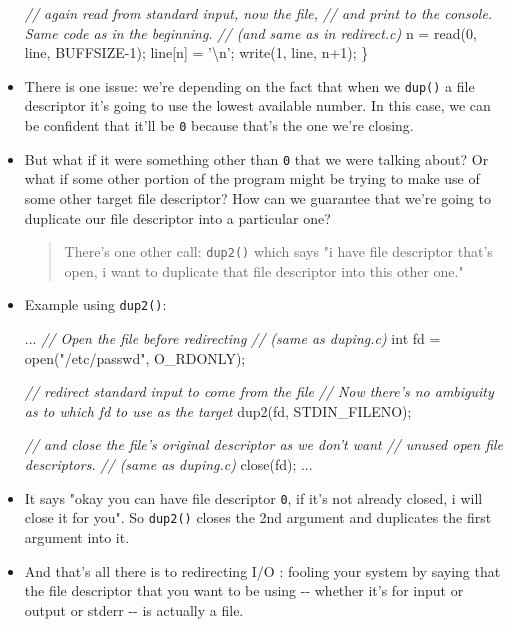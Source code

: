 \documentclass[]{article}
\newenvironment{Shaded}{}{}
\newcommand{\DataTypeTok}[1]{\textcolor[rgb]{0.56,0.13,0.00}{#1}}
\newcommand{\DecValTok}[1]{\textcolor[rgb]{0.25,0.63,0.44}{#1}}
\newcommand{\CharTok}[1]{\textcolor[rgb]{0.25,0.44,0.63}{#1}}
\newcommand{\StringTok}[1]{\textcolor[rgb]{0.25,0.44,0.63}{#1}}
\newcommand{\CommentTok}[1]{\textcolor[rgb]{0.38,0.63,0.69}{\textit{#1}}}
\newcommand{\NormalTok}[1]{#1}
\begin{document}
\begin{itemize}
\begin{Shaded}
\begin{Highlighting}[]
    \CommentTok{// again read from standard input, now the file, }
    \CommentTok{// and print to the console. Same code as in the beginning.}
    \CommentTok{// (and same as in redirect.c)}
\NormalTok{    n = read(}\DecValTok{0}\NormalTok{, line, BUFFSIZE}\DecValTok{-1}\NormalTok{);}
\NormalTok{    line[n] = }\CharTok{'\textbackslash{}n'}\NormalTok{;}
\NormalTok{    write(}\DecValTok{1}\NormalTok{, line, n+}\DecValTok{1}\NormalTok{);}
\NormalTok{\}}
\end{Highlighting}
\end{Shaded}
\item
  There is one issue: we're depending on the fact that when we
  \texttt{dup()} a file descriptor it's going to use the lowest
  available number. In this case, we can be confident that it'll be
  \texttt{0} because that's the one we're closing. 
\item
  But what if it were something other than \texttt{0} that we were
  talking about? Or what if some other portion of the program might be
  trying to make use of some other target file descriptor? How can we
  guarantee that we're going to duplicate our file descriptor into a
  particular one?

  \begin{quote}
  There's one other call: \texttt{dup2()} which says "i have file
  descriptor that's open, i want to duplicate that file descriptor into
  this other one."
  \end{quote}
\item
  Example using \texttt{dup2()}:

\begin{Shaded}
\begin{Highlighting}[]
\NormalTok{...}
\CommentTok{// Open the file before redirecting}
\CommentTok{// (same as duping.c)}
\DataTypeTok{int}\NormalTok{ fd = open(}\StringTok{"/etc/passwd"}\NormalTok{, O_RDONLY);}

\CommentTok{// redirect standard input to come from the file}
\CommentTok{// Now there's no ambiguity as to which fd to use as the target}
\NormalTok{dup2(fd, STDIN_FILENO);}

\CommentTok{// and close the file's original descriptor as we don't want}
\CommentTok{// unused open file descriptors. }
\CommentTok{// (same as duping.c)}
\NormalTok{close(fd);}
\NormalTok{...}
\end{Highlighting}
\end{Shaded}
\item
  It says "okay you can have file descriptor \texttt{0}, if it's not
  already closed, i will close it for you". So \texttt{dup2()} closes
  the 2nd argument and duplicates the first argument into it.
\item
  And that's all there is to redirecting I/O : fooling your system by
  saying that the file descriptor that you want to be using -\/- whether
  it's for input or output or stderr -\/- is actually a file. 
\end{itemize}
\end{document}
